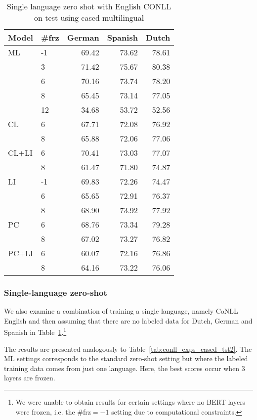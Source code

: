 \documentclass[letterpaper]{article} \usepackage{aaai20}  \usepackage{times}  \usepackage{helvet} \usepackage{courier}  \usepackage[hyphens]{url}  \usepackage{graphicx} \urlstyle{rm} \def\UrlFont{\rm}  \usepackage{graphicx}  \frenchspacing  \setlength{\pdfpagewidth}{8.5in}  \setlength{\pdfpageheight}{11in}  \usepackage{amsmath}
\begin{document}
\begin{table}
\begin{center}
\begin{tabular}{llrrr}
\toprule
 Model     &  \#frz &   German &   Spanish &   Dutch \\
\midrule
ML & -1  & 69.42 & 73.62 & 78.61 \\
      &  3  & 71.42 & 75.67 & 80.38 \\ &  6  & 70.16 & 73.74 & 78.20 \\
      &  8  & 65.45 & 73.14 & 77.05 \\
      &  12 & 34.68 & 53.72 & 52.56 \\
CL &  6  & 67.71 & 72.08 & 76.92 \\
      &  8  & 65.88 & 72.06 & 77.06 \\
CL+LI &  6  & 70.41 & 73.03 & 77.07 \\
      &  8  & 61.47 & 71.80 & 74.87 \\
LI & -1  & 69.83 & 72.26 & 74.47 \\
      &  6  & 65.65 & 72.91 & 76.37 \\
      &  8  & 68.90 & 73.92 & 77.92 \\
PC &  6  & 68.76 & 73.34 & 79.28 \\
      &  8  & 67.02 & 73.27 & 76.82 \\
PC+LI &  6  & 60.07 & 72.16 & 76.86 \\
      &  8  & 64.16 & 73.22 & 76.06 \\
\bottomrule
\end{tabular}
\caption{Single language zero shot with English CONLL on test using cased multilingual}
\label{tab:conll_csd_sl_tst}
\end{center}
\end{table}
 \subsubsection{Single-language zero-shot}
We also examine a combination of training a single language, namely CoNLL English and then assuming that there are no labeled data for Dutch, German and Spanish in Table~\ref{tab:conll_csd_sl_tst}.\footnote{We were unable to obtain results for certain settings where no BERT layers were frozen, i.e. the \#frz$=-1$ setting due to computational constraints.}

The results are presented analogously to Table~\ref{tab:conll_exps_cased_tst2}. The ML settings corresponds to the standard zero-shot setting but where the labeled training data comes from just one language. Here, the best scores occur when 3 layers are frozen.
\end{document}
